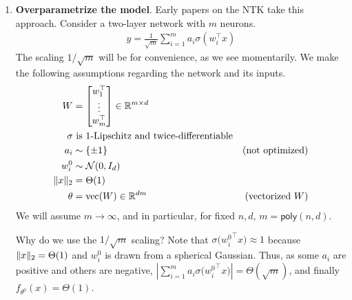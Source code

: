 \begin{enumerate}
\begin{remark}
    \end{remark}
    \item \textbf{Overparametrize the model}. Early papers on the NTK take this approach. Consider a  two-layer network with $m$ neurons. 
    \begin{align}
        \hat{y} = \frac{1}{\sqrt{m}} \sum_{i=1}^m a_i \sigma(w_i^\top x )
    \end{align} 
    The scaling $1/\sqrt{m}$ will be for convenience, as we see momentarily. We make the following assumptions regarding the network and its inputs.
    \begin{align}
        W &= \begin{bmatrix} w_1^\top \\ \vdots \\ w_m^\top \end{bmatrix} \in \mathbb R^{m \times d} \\
        \sigma &\text{ is $1$-Lipschitz and twice-differentiable} \\
        a_i &\sim \{\pm 1\} \quad &\text{(not optimized)} \\
        w_i^0 &\sim \mathcal N(0, I_d) \\
        \|x\|_2 &= \Theta(1) \\
        \theta &= \text{vec}(W) \in \mathbb R^{dm} \quad &\text{(vectorized $W$)}
    \end{align} 
    We will assume $m \to \infty$, and in particular, for fixed $n,d$, $m = \textsf{poly}(n,d)$.
    
    Why do we use the $1/\sqrt{m}$ scaling? Note that $\sigma\big({w_i^0}^\top x\big) \approx 1$ because $\|x\|_2 = \Theta(1)$ and $w_i^0$ is drawn from a spherical Gaussian. Thus, as some $a_i$ are positive and others are negative, $\left|\sum_{i=1}^m a_i \sigma \big({w_i^0}^\top x\big) \right| = \Theta \left( \sqrt{m} \right)$, and finally $f_{\theta^0} (x) = \Theta(1)$. 
    

\end{enumerate}

